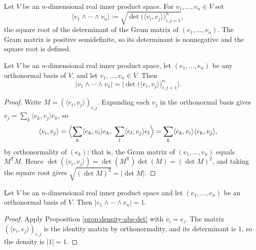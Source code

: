 \begin{definition}
\label{def:density-pointwise}
\leanok
Let $V$ be an $n$-dimensional real inner product space. For $v_1, \ldots, v_n \in V$ set
\[
|v_1 \wedge \cdots \wedge v_n| := \sqrt{\det \bigl( \langle v_i, v_j \rangle \bigr)_{i,j=1}^{n}},
\]
the square root of the determinant of the Gram matrix of $(v_1, \ldots, v_n)$. The Gram matrix
is positive semidefinite, so its determinant is nonnegative and the square root is defined.
\end{definition}

\begin{proposition}
\label{prop:density-abs-det}
\leanok
{}
Let $V$ be an $n$-dimensional real inner product space, let $(e_1, \ldots, e_n)$ be any
orthonormal basis of $V$, and let $v_1, \ldots, v_n \in V$. Then
\[
|v_1 \wedge \cdots \wedge v_n| = \bigl| \det \bigl( \langle e_i, v_j \rangle \bigr)_{i,j=1}^{n} \bigr|.
\]
\end{proposition}

\begin{proof}
\leanok
{}
Write $M = (\langle e_i, v_j \rangle)_{i,j}$. Expanding each $v_j$ in the orthonormal basis gives
$v_j = \sum_k \langle e_k, v_j \rangle e_k$, so
\[
\langle v_i, v_j \rangle
= \Bigl\langle \sum_k \langle e_k, v_i \rangle e_k, \; \sum_l \langle e_l, v_j \rangle e_l \Bigr\rangle
= \sum_k \langle e_k, v_i \rangle \langle e_k, v_j \rangle,
\]
by orthonormality of $(e_k)$; that is, the Gram matrix of $(v_1, \ldots, v_n)$ equals
$M^{\mathsf{T}} M$. Hence
$\det (\langle v_i, v_j \rangle) = \det(M^{\mathsf{T}}) \det(M) = (\det M)^2$, and taking the
square root gives $\sqrt{(\det M)^2} = |\det M|$.
\end{proof}

\begin{proposition}
\label{prop:density-value-one}
\leanok
{}
Let $V$ be an $n$-dimensional real inner product space and let $(e_1, \ldots, e_n)$ be an
orthonormal basis of $V$. Then $|e_1 \wedge \cdots \wedge e_n| = 1$.
\end{proposition}

\begin{proof}
\leanok
{}
Apply Proposition \ref{prop:density-abs-det} with $v_i = e_i$. The matrix
$(\langle e_i, e_j \rangle)_{i,j}$ is the identity matrix by orthonormality, and its determinant
is $1$, so the density is $|1| = 1$.
\end{proof}

